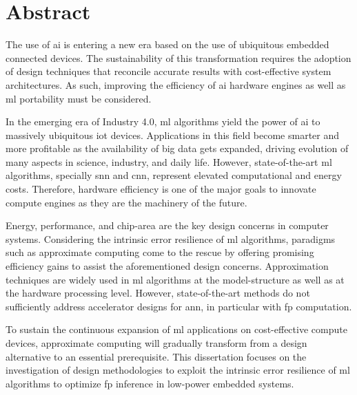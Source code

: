 \chapter*{Abstract}
\thispagestyle{empty}
The use of \gls{ai} is entering a new era based on the use of ubiquitous embedded connected devices. The sustainability of this transformation requires the adoption of design techniques that reconcile accurate results with cost-effective system architectures. As such, improving the efficiency of \gls{ai} hardware engines as well as \gls{ml} portability must be considered.

In the emerging era of Industry 4.0, \gls{ml} algorithms yield the power of \gls{ai} to massively ubiquitous \gls{iot} devices. Applications in this field become smarter and more profitable as the availability of big data gets expanded, driving evolution of many aspects in science, industry, and daily life. However, state-of-the-art \gls{ml} algorithms, specially \gls{snn} and \gls{cnn}, represent elevated computational and energy costs. Therefore, hardware efficiency is one of the major goals to innovate compute engines as they are the machinery of the future.

Energy, performance, and chip-area are the key design concerns in computer systems. Considering the intrinsic error resilience of \gls{ml} algorithms, paradigms such as approximate computing come to the rescue by offering promising efficiency gains to assist the aforementioned design concerns. Approximation techniques are widely used in \gls{ml} algorithms at the model-structure as well as at the hardware processing level. However, state-of-the-art methods do not sufficiently address accelerator designs for \gls{ann}, in particular with \gls{fp} computation.

To sustain the continuous expansion of \gls{ml} applications on cost-effective compute devices, approximate computing will gradually transform from a design alternative to an essential prerequisite. This dissertation focuses on the investigation of design methodologies to exploit the intrinsic error resilience of \gls{ml} algorithms to optimize \gls{fp} inference in low-power embedded systems.

